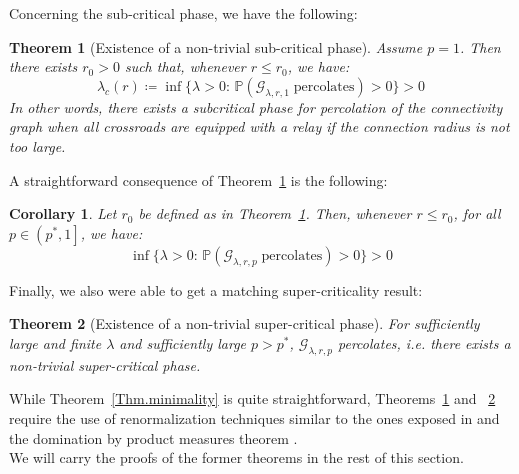 \documentclass[10pt,a4paper]{amsart}
\theoremstyle{exampstyle}
\newtheorem{Theorem}{Theorem}
\newtheorem{Corollary}{Corollary}
\theoremstyle{exampnotations}
\begin{document}
Concerning the sub-critical phase, we have the following:
\begin{Theorem}[Existence of a non-trivial sub-critical phase]
\label{Thm.subcritical}
Assume $p=1$. Then there exists $r_{0} > 0$ such that, whenever $r \leq r_0$, we have:
\begin{equation*}
    \lambda_c(r) \coloneqq \inf \lbrace \lambda > 0 : \, \mathbb{P}(\mathcal{G}_{\lambda, r, 1} \; \text{percolates}) > 0 \rbrace > 0
\end{equation*}
In other words, there exists a subcritical phase for percolation of the connectivity graph when all crossroads are equipped with a relay if the connection radius is not too large.
\end{Theorem}

A straightforward consequence of Theorem~\ref{Thm.subcritical} is the following:

\begin{Corollary}
\label{Coroll.subcritical}
Let $r_0$ be defined as in Theorem~\ref{Thm.subcritical}. Then, whenever $r \leq r_{0}$, for all $p \in \left(p^*,1\right]$, we have:
\begin{equation*}
    \inf \lbrace \lambda > 0 : \, \mathbb{P}(\mathcal{G}_{\lambda, r, p} \; \text{percolates}) > 0 \rbrace > 0
\end{equation*}
\end{Corollary}

Finally, we also were able to get a matching super-criticality result:

\begin{Theorem}[Existence of a non-trivial super-critical phase]
\label{Thm.supercritical}
For sufficiently large and finite $\lambda$ and sufficiently large $p > p^*$, $\mathcal{G}_{\lambda,r,p}$ percolates, i.e. there exists a non-trivial super-critical phase.
\end{Theorem}

While Theorem~\ref{Thm.minimality} is quite straightforward, Theorems~\ref{Thm.subcritical} and ~\ref{Thm.supercritical} require the use of renormalization techniques similar to the ones exposed in \cite{hirsch_continuum_2017} and the domination by product measures theorem \cite[Theorem 0.0]{liggett_domination_1997}. \\
We will carry the proofs of the former theorems in the rest of this section.
\end{document}
